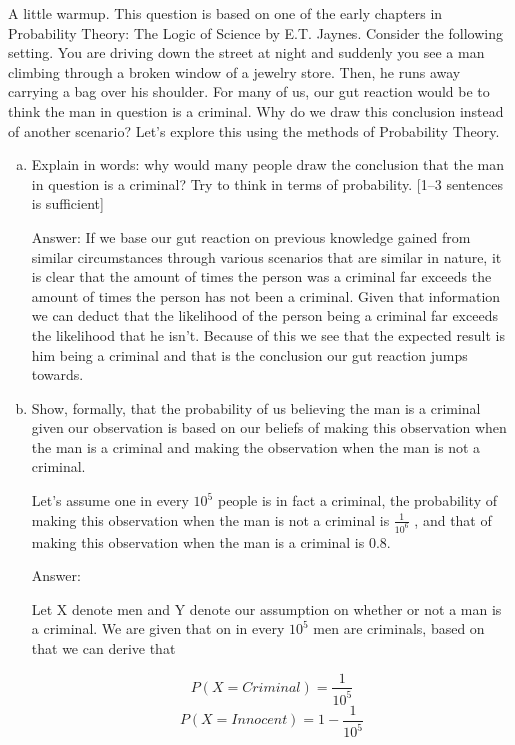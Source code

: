 \documentclass[12pt,letterpaper]{article}
\begin{document}
A little warmup. This question is based on one of the early chapters in Probability Theory: The Logic of Science by E.T. Jaynes. Consider the following setting. You are driving down the street at night and suddenly you see a man climbing through a broken window of a jewelry store. Then, he runs away carrying a bag over his shoulder. For many of us, our gut reaction would be to think the man in question is a criminal. Why do we draw this conclusion instead of another scenario? Let’s explore this using the methods of Probability Theory.

\begin{enumerate}[(a)]
  \item
    Explain in words: why would many people draw the conclusion that the man in question is a criminal? Try to think in terms of probability. [1–3 sentences is sufficient] 
   
    Answer: If we base our gut reaction on previous knowledge gained from similar circumstances through various scenarios that are similar in nature, it is clear that the amount of times the person was a criminal far exceeds the amount of times the person has not been a criminal. Given that information we can deduct that the likelihood of the person being a criminal far exceeds the likelihood that he isn't. Because of this we see that the expected result is him being a criminal and that is the conclusion our gut reaction jumps towards.

  \item
    Show, formally, that the probability of us believing the man is a criminal
    given our observation is based on our beliefs of making this observation
    when the man is a criminal and making the observation when the man
    is not a criminal.
    
    Let’s assume one in every $10^5$ people is in fact a criminal, the probability
    of making this observation when the man is not a criminal is $\frac{1}{10^6}$ , and
    that of making this observation when the man is a criminal is 0.8.
    
    
    Answer: 
    
    Let X denote men and Y denote our assumption on whether or not a man is a criminal. We are given that on in every ${10^5}$ men are criminals, based on that we can derive that
    \begin{multicols}{2}
      \begin{equation*}
        P(X = Criminal) = \frac{1}{10^5}
      \end{equation*}\break
      \begin{equation*}
        P(X = Innocent) = 1 - \frac{1}{10^5}
      \end{equation*}
    \end{multicols}
    

\end{enumerate}
\end{document}
